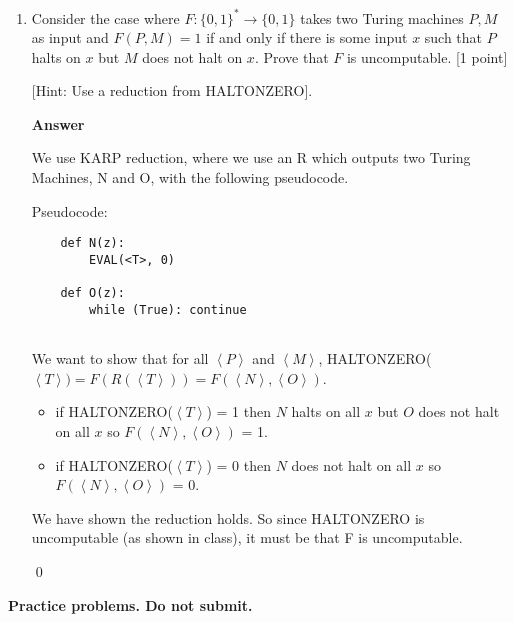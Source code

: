 \documentclass[11pt]{article}
\newcommand \kw[1]{\textbf{#1}}
\newenvironment{answer}{
\vspace{.5cm}
\begin{mdframed}[]
    \kw{Answer} 
}
{
\end{mdframed}
\pagebreak
}
\begin{document}
\begin{enumerate}
\begin{answer}
    We have shown the reduction holds. So since NOTHALTONZERO is uncomputable (via theorem in class), it must be that Finite is uncomputable.

    \qed

\end{answer}

\item Consider the case where $F:\{0,1\}^* \rightarrow \{0,1\}$ takes two Turing machines $P,M$ as input and $F(P,M) = 1$ if and only if there is some input $x$ such that $P$ halts on $x$ but $M$ does not halt on $x$. Prove that $F$ is uncomputable. [1 point]

[Hint: Use a reduction from HALTONZERO].

\begin{answer}

    We use KARP reduction, where we use an R which outputs two Turing Machines, N and O, with the following pseudocode.

    Pseudocode:
    \begin{verbatim}
    def N(z):
        EVAL(<T>, 0)

    def O(z):
        while (True): continue
        
    \end{verbatim}

    We want to show that for all $\left<P\right>$ and $\left<M\right>$, HALTONZERO($\left<T\right>) = F(R(\left<T\right>)) = F(\left<N\right>, \left<O\right>)$.
    \begin{itemize}
        \item if HALTONZERO($\left<T\right>$) = 1 then $N$ halts on all $x$ but $O$ does not halt on all $x$ so $F(\left<N\right>, \left<O\right>)$ = 1.
        \item if HALTONZERO($\left<T\right>$) = 0 then $N$ does not halt on all $x$ so $F(\left<N\right>, \left<O\right>)$ = 0.
    \end{itemize} 

    We have shown the reduction holds. So since HALTONZERO is uncomputable (as shown in class), it must be that F is uncomputable.

    \qed
\end{answer}   

\end{enumerate}

{\bf Practice problems. Do not submit.}
\end{document}
